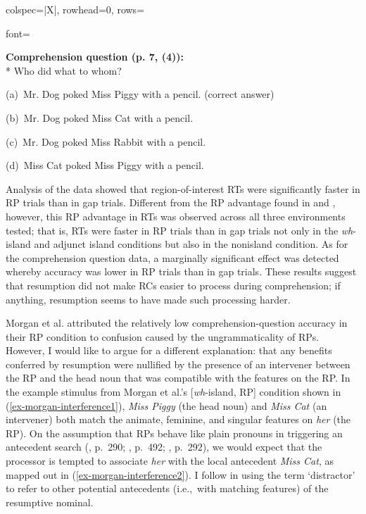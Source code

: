 \begin{longtblr}[caption={\textcite{morgan.etal2020}: Self-paced reading task}, label={tblr:morgan}]{colspec={|X|}, rowhead=0, rows={font=\raggedright{}}}
\textbf{Comprehension question (p. 7, (4)):} \vspace{5pt}\\*
\setlength{\leftskip}{5pt}Who did what to whom?
\par\nobreak
(a)~Mr. Dog poked Miss Piggy with a pencil. (correct answer)\par\nobreak
(b)~Mr. Dog poked Miss Cat with a pencil.\par\nobreak
(c)~Mr. Dog poked Miss Rabbit with a pencil.\par\nobreak
(d)~Miss Cat poked Miss Piggy with a pencil.
\\\hline
\end{longtblr}

Analysis of the data showed that region-of-interest RTs were significantly faster in RP trials than in gap trials. Different from the RP advantage found in \textcite{hofmeister.norcliffe2013} and \textcite{hammerly2022}, however, this RP advantage in RTs was observed across all three environments tested; that is, RTs were faster in RP trials than in gap trials not only in the \textit{wh}-island and adjunct island conditions but also in the nonisland condition. As for the comprehension question data, a marginally significant effect was detected whereby accuracy was lower in RP trials than in gap trials. These results suggest that resumption did not make RCs easier to process during comprehension; if anything, resumption seems to have made such processing harder.

Morgan et al. attributed the relatively low comprehension-question accuracy in their RP condition to confusion caused by the ungrammaticality of RPs. However, I would like to argue for a different explanation: that any benefits conferred by resumption were nullified by the presence of an intervener between the RP and the head noun that was compatible with the features on the RP. In the example stimulus from Morgan et al.'s [\textit{wh}-island, RP] condition shown in (\ref{ex-morgan-interference1}), \textit{Miss Piggy} (the head noun) and \textit{Miss Cat} (an intervener) both match the animate, feminine, and singular features on \textit{her} (the RP). On the assumption that RPs behave like plain pronouns in triggering an antecedent search (\cite{doron2011}, p.~290; \cite{prince1990}, p.~492; \cite{sells1987}, p.~292), we would expect that the processor is tempted to associate \textit{her} with the local antecedent \textit{Miss Cat}, as mapped out in (\ref{ex-morgan-interference2}). I follow \textcite{keshev.etal2019} in using the term `distractor' to refer to other potential antecedents (i.e.,~with matching features) of the resumptive nominal.

